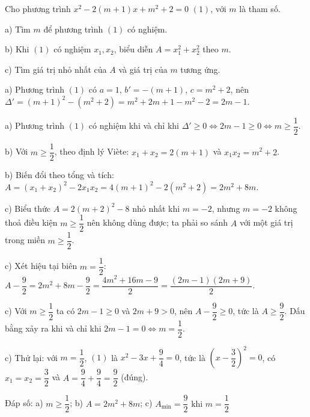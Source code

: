\begin{problem}[9DS-PT2-050]
Cho phương trình $x^2 - 2(m + 1)x + m^2 + 2 = 0$ $(1)$, với $m$ là tham số.

a) Tìm $m$ để phương trình $(1)$ có nghiệm.

b) Khi $(1)$ có nghiệm $x_1, x_2$, biểu diễn $A = x_1^2 + x_2^2$ theo $m$.

c) Tìm giá trị nhỏ nhất của $A$ và giá trị của $m$ tương ứng.

\begin{solution}
a) Phương trình $(1)$ có $a = 1$, $b' = -(m + 1)$, $c = m^2 + 2$, nên $\Delta' = (m + 1)^2 - (m^2 + 2) = m^2 + 2m + 1 - m^2 - 2 = 2m - 1$.

a) Phương trình $(1)$ có nghiệm khi và chỉ khi $\Delta' \geq 0 \Leftrightarrow 2m - 1 \geq 0 \Leftrightarrow m \geq \dfrac{1}{2}$.

b) Với $m \geq \dfrac{1}{2}$, theo định lý Viète: $x_1 + x_2 = 2(m + 1)$ và $x_1x_2 = m^2 + 2$.

b) Biến đổi theo tổng và tích: $A = (x_1 + x_2)^2 - 2x_1x_2 = 4(m + 1)^2 - 2(m^2 + 2) = 2m^2 + 8m$.

c) Biểu thức $A = 2(m + 2)^2 - 8$ nhỏ nhất khi $m = -2$, nhưng $m = -2$ không thoả điều kiện $m \geq \dfrac{1}{2}$ nên không dùng được; ta phải so sánh $A$ với một giá trị trong miền $m \geq \dfrac{1}{2}$.

c) Xét hiệu tại biên $m = \dfrac{1}{2}$: $A - \dfrac{9}{2} = 2m^2 + 8m - \dfrac{9}{2} = \dfrac{4m^2 + 16m - 9}{2} = \dfrac{(2m - 1)(2m + 9)}{2}$.

c) Với $m \geq \dfrac{1}{2}$ ta có $2m - 1 \geq 0$ và $2m + 9 > 0$, nên $A - \dfrac{9}{2} \geq 0$, tức là $A \geq \dfrac{9}{2}$. Dấu bằng xảy ra khi và chỉ khi $2m - 1 = 0 \Leftrightarrow m = \dfrac{1}{2}$.

c) Thử lại: với $m = \dfrac{1}{2}$, $(1)$ là $x^2 - 3x + \dfrac{9}{4} = 0$, tức là $\left(x - \dfrac{3}{2}\right)^2 = 0$, có $x_1 = x_2 = \dfrac{3}{2}$ và $A = \dfrac{9}{4} + \dfrac{9}{4} = \dfrac{9}{2}$ (đúng).

Đáp số: a) $\boxed{m \geq \dfrac{1}{2}}$; b) $\boxed{A = 2m^2 + 8m}$; c) $\boxed{A_{\min} = \dfrac{9}{2} \text{ khi } m = \dfrac{1}{2}}$
\end{solution}
\end{problem}

